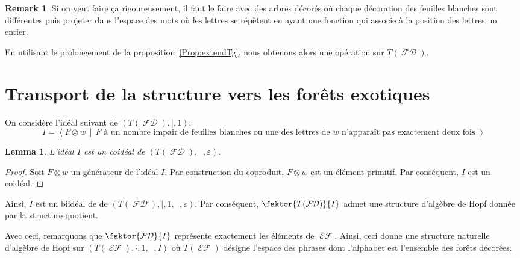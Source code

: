 \documentclass[french]{article}
\theoremstyle{definition}
\newtheorem{Rq}{\textbf{Remark}}[section]
\theoremstyle{plain}
\newtheorem{Lemme}[defi]{Lemma}
\newcommand{\e}{\varepsilon}
\DeclareMathOperator{\Dsh}{{\Delta_{\shuffle}}}
\DeclareMathOperator{\EF}{\mathcal{EF}}
\DeclareMathOperator{\FD}{\mathcal{FD}}
\begin{document}
\begin{Rq}
	Si on veut faire ça rigoureusement, il faut le faire avec des arbres décorés où chaque décoration des feuilles blanches sont différentes puis projeter dans l'espace des mots où les lettres se répètent en ayant une fonction qui associe à la position des lettres un entier.
\end{Rq}

En utilisant le prolongement de la proposition~\ref{Prop:extendTg}, nous obtenons alors une opération \PH{} sur $T(\FD)$.

\section{Transport de la structure vers les forêts exotiques}

On considère l'idéal suivant de $(T(\FD),|,1)$:
\[
I=\left\langle F\otimes w \,\middle| \, F \text{ à un nombre impair de feuilles blanches ou une des lettres de } w \text{ n'apparaît pas exactement deux fois } \right\rangle
\]
\begin{Lemme}
	L'idéal $I$ est un coidéal de $(T(\FD), \Dsh, \e)$.
\end{Lemme}
\begin{proof}
	Soit $F\otimes w$ un générateur de l'idéal $I$. Par construction du coproduit, $F\otimes w$ est un élément primitif. Par conséquent, $I$ est un coidéal.
\end{proof}

Ainsi, $I$ est un biidéal de de $(T(\FD), |, 1, \Dsh, \e)$. Par conséquent, $\faktor{T(\FD)}{I}$ admet une structure d'algèbre de Hopf donnée par la structure quotient. 

%

Avec ceci, remarquons que $\faktor{\FD}{I}$ représente exactement les éléments de $\EF$. Ainsi, ceci donne une structure naturelle d'algèbre de Hopf sur $(T(\EF),\cdot,1,\Dsh,I)$ où $T(\EF)$ désigne l'espace des phrases dont l'alphabet est l'ensemble des forêts décorées.
\end{document}
